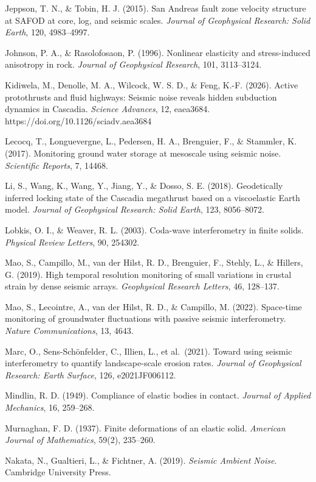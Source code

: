 \documentclass[12pt]{article}
\begin{document}
Jeppson, T. N., \& Tobin, H. J. (2015). San Andreas fault zone velocity
structure at SAFOD at core, log, and seismic scales. \emph{Journal of
Geophysical Research: Solid Earth}, 120, 4983--4997.

Johnson, P. A., \& Rasolofosaon, P. (1996). Nonlinear elasticity and
stress-induced anisotropy in rock. \emph{Journal of Geophysical
Research}, 101, 3113--3124.

Kidiwela, M., Denolle, M. A., Wilcock, W. S. D., \& Feng, K.-F. (2026).
Active protothrusts and fluid highways: Seismic noise reveals hidden
subduction dynamics in Cascadia. \emph{Science Advances}, 12, eaea3684.
https://doi.org/10.1126/sciadv.aea3684

Lecocq, T., Longuevergne, L., Pedersen, H. A., Brenguier, F., \&
Stammler, K. (2017). Monitoring ground water storage at mesoscale using
seismic noise. \emph{Scientific Reports}, 7, 14468.

Li, S., Wang, K., Wang, Y., Jiang, Y., \& Dosso, S. E. (2018).
Geodetically inferred locking state of the Cascadia megathrust based on
a viscoelastic Earth model. \emph{Journal of Geophysical Research: Solid
Earth}, 123, 8056--8072.

Lobkis, O. I., \& Weaver, R. L. (2003). Coda-wave interferometry in
finite solids. \emph{Physical Review Letters}, 90, 254302.

Mao, S., Campillo, M., van der Hilst, R. D., Brenguier, F., Stehly, L.,
\& Hillers, G. (2019). High temporal resolution monitoring of small
variations in crustal strain by dense seismic arrays. \emph{Geophysical
Research Letters}, 46, 128--137.

Mao, S., Lecointre, A., van der Hilst, R. D., \& Campillo, M. (2022).
Space-time monitoring of groundwater fluctuations with passive seismic
interferometry. \emph{Nature Communications}, 13, 4643.

Marc, O., Sens-Schönfelder, C., Illien, L., et al.~(2021). Toward using
seismic interferometry to quantify landscape-scale erosion rates.
\emph{Journal of Geophysical Research: Earth Surface}, 126,
e2021JF006112.

Mindlin, R. D. (1949). Compliance of elastic bodies in contact.
\emph{Journal of Applied Mechanics}, 16, 259--268.

Murnaghan, F. D. (1937). Finite deformations of an elastic solid.
\emph{American Journal of Mathematics}, 59(2), 235--260.

Nakata, N., Gualtieri, L., \& Fichtner, A. (2019). \emph{Seismic Ambient
Noise}. Cambridge University Press.
\end{document}
